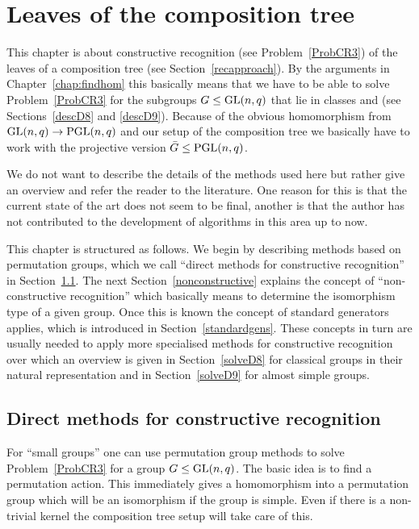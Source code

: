 
\chapter{Leaves of the composition tree}
\label{chap:leaves}

This chapter is about constructive recognition (see
Problem~\ref{ProbCR3}) of the leaves of a
composition tree (see Section~\ref{recapproach}). By the arguments in
Chapter~\ref{chap:findhom} this basically means that we have to be
able to solve Problem~\ref{ProbCR3} for the subgroups $G \le \GL(n,q)$
that lie in classes  and  (see Sections~\ref{descD8} and
\ref{descD9}). Because of the obvious homomorphism from $\GL(n,q) \to
\PGL(n,q)$ and our setup of the composition tree we basically have
to work with the projective version $\bar G \le \PGL(n,q)$.

We do not want to describe the details of the methods used here but
rather give an overview and refer the reader to the literature.
One reason for this is that the current state of the art does not seem
to be final, another is that the author has not contributed to the
development of algorithms in this area up to now.

This chapter is structured as follows. We begin by describing
methods based on permutation groups, which we call ``direct methods
for constructive recognition'' in Section~\ref{solvedirect}. The
next Section~\ref{nonconstructive} explains the concept of
``non-constructive recognition'' which basically means to determine
the isomorphism type of a given group. Once this is known the
concept of standard generators applies, which is introduced in
Section~\ref{standardgens}. These concepts in turn are usually needed to apply
more specialised methods for constructive recognition over which an
overview is given in Section~\ref{solveD8} for classical groups in
their natural representation and in
Section~\ref{solveD9} for almost simple groups.

\section{Direct methods for constructive recognition}
\label{solvedirect}

For ``small groups'' one can use permutation group methods to solve
Problem~\ref{ProbCR3} for a group $G \le \GL(n,q)$. The basic idea is
to find a permutation action. This immediately gives a homomorphism
into a permutation group which will be an isomorphism if the group is
simple. Even if there is a non-trivial kernel the composition tree setup
will take care of this.

